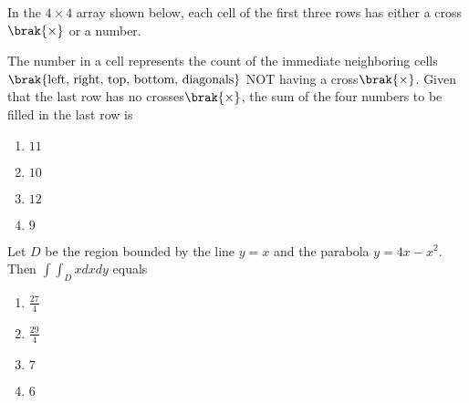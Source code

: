 \item{
In the $4\times 4$ array shown below, each cell of the first three rows has either a cross$\brak{\times}$ or a number.
\begin{figure}[H]
\centering
{}%

\label{fig:my_label}
\end{figure}
The number in a cell represents the count of the immediate neighboring cells $\brak{\text{left, right, top, bottom, diagonals}}$ NOT having a cross$\brak{\times}$. Given that the last row has no crosses$\brak{\times}$, the sum of the four numbers to be filled in the last row is
\begin{multicols}{4}
\begin{enumerate}
\item $11$
\item $10$
\item $12$
\item $9$
\end{enumerate}
\end{multicols}
}
\item{
Let $D$ be the region bounded by the line $y=x$ and the parabola $y=4x-x^2$. Then $\int\int_Dxdxdy$ equals
\begin{multicols}{4}
\begin{enumerate}
\item $\frac{27}{4}$
\item $\frac{29}{4}$
\item $7$
\item $6$
\end{enumerate}
\end{multicols}
}
